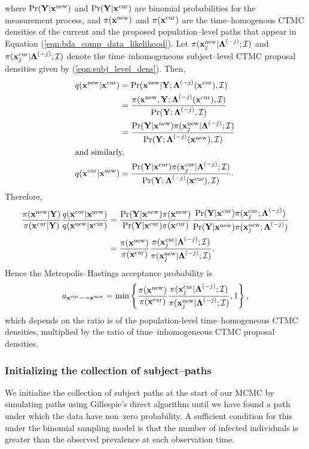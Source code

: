 where $ \Pr(\by|\xnew) $ and $ \Pr(\by|\xcur )$ are binomial probabilities for the measurement process, and $ \pi(\xnew) $ and $ \pi(\xcur) $ are the time--homogenous CTMC densities of the current and the proposed population--level paths that appear in Equation (\ref{eqn:bda_comp_data_likelihood}). Let $ \pi(\xnew_j|\bLambda^{(-j)}; \mcI) $ and $ \pi(\xcur_j| \bLambda^{(-j)}; \mcI) $ denote the time--inhomogeneous subject--level CTMC proposal densities given by (\ref{eqn:subj_level_dens}). Then,
\begin{align*}
	q(\xnew|\xcur) &= \Pr(\xnew|\by; \bLambda^{(-j)}(\xcur), \mcI)\\
	&= \frac{\pi(\xnew, \by; \bLambda^{(-j)}(\xcur), \mcI)}{\Pr(\by; \bLambda^{(-j)}, \mcI)}\\
	&= \frac{\Pr(\by|\xnew)\pi(\xnew_j| \bLambda^{(-j)}; \mcI)}{\Pr(\by; \bLambda^{(-j)}(\xnew), \mcI)}\\
	\shortintertext{and similarly, } q(\xcur|\xnew) &= \frac{\Pr(\by|\xcur)\pi(\xcur_j| \bLambda^{(-j)}; \mcI)}{\Pr(\by; \bLambda^{(-j)}(\xcur), \mcI)}.
\end{align*}
Therefore, 
\begin{align*}
	\frac{\pi(\xnew|\by)}{\pi(\xcur|\by)}\frac{q(\xcur|\xnew)}{q(\xnew|\xcur)} &= \frac{\Pr(\by|\xnew)\pi(\xnew)}{\Pr(\by|\xcur)\pi(\xcur)}\frac{\Pr(\by|\xcur)\pi(\xcur_j; \bLambda^{(-j)})}{\Pr(\by|\xnew)\pi(\xnew_j; \bLambda^{(-j)})}\\
	&= \frac{\pi(\xnew)}{\pi(\xcur)}\frac{\pi(\xcur_j| \bLambda^{(-j)}; \mcI)}{\pi(\xnew_j| \bLambda^{(-j)}; \mcI)}.
\end{align*}
Hence the Metropolis--Hastings acceptance probability is
\begin{equation*}
a_{\xcur \longrightarrow\xnew}=\min \left \lbrace  \frac{\pi(\xnew)}{\pi(\xcur)}\frac{\pi(\xcur_j| \bLambda^{(-j)}; \mcI)}{\pi(\xnew_j| \bLambda^{(-j)}; \mcI)} , 1 \right \rbrace, 
\end{equation*}
which depends on the ratio is of the population-level time--homogeneous CTMC densities, multiplied by the ratio of time--inhomogeneous CTMC proposal densities. 

\subsubsection{Initializing the collection of subject--paths}
We initialize the collection of subject paths at the start of our MCMC by simulating paths using Gillespie's direct algorithm \cite{gillespie1976general} until we have found a path under which the data have non--zero probability. 
A sufficient condition for this under the binomial sampling model is that the number of infected individuals is greater than the observed prevalence at each observation time. 

